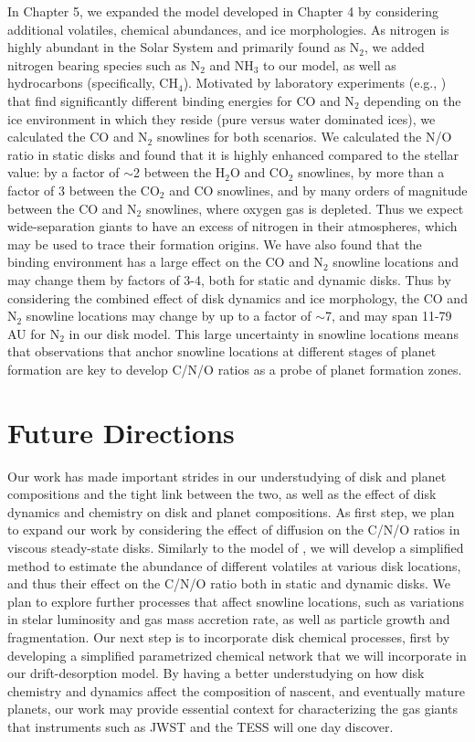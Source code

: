 In Chapter 5, we expanded the model developed in Chapter 4 by considering additional volatiles, chemical abundances, and ice morphologies. As nitrogen is highly abundant in the Solar System and primarily found as N$_2$, we added nitrogen bearing species such as N$_2$ and NH$_3$ to our model, as well as hydrocarbons (specifically, CH$_4$). Motivated by laboratory experiments (e.g., \citealt{fayolle16}) that find significantly different binding energies for CO and N$_2$ depending on the ice environment in which they reside (pure versus water dominated ices), we calculated the CO and N$_2$ snowlines for both scenarios. We calculated the N/O ratio in static disks and found that it is highly enhanced compared to the stellar value: by a factor of $\sim$2 between the H$_2$O and CO$_2$ snowlines, by more than a factor of 3 between the CO$_2$ and CO snowlines, and by many orders of magnitude between the CO and N$_2$ snowlines, where oxygen gas is depleted. Thus we expect wide-separation giants to have an excess of nitrogen in their atmospheres, which may be used to trace their formation origins. We have also found that the binding environment has a large effect on the CO and N$_2$ snowline locations and may change them by factors of 3-4, both for static and dynamic disks. Thus by considering the combined effect of disk dynamics and ice morphology, the CO and N$_2$ snowline locations may change by up to a factor of $\sim$7, and may span 11-79 AU for N$_2$ in our disk model. This large uncertainty in snowline locations means that observations that anchor snowline locations at different stages of planet
formation are key to develop C/N/O ratios as a probe of planet formation zones. 

\section{Future Directions}
\label{sec:future}

Our work has made important strides in our understudying of disk and planet compositions and the tight link between the two, as well as the effect of disk dynamics and chemistry on disk and planet compositions. As first step, we plan to expand our work by considering the effect of diffusion on the C/N/O ratios in viscous steady-state disks. Similarly to the model of \citet{owen14}, we will develop a simplified method to estimate the abundance of different volatiles at various disk locations, and thus their effect on the C/N/O ratio both in static and dynamic disks. We plan to explore further processes that affect snowline locations, such as variations in stelar luminosity and gas mass accretion rate, as well as particle growth and fragmentation. Our next step is to incorporate disk chemical processes, first by developing a simplified parametrized chemical  network that we will incorporate in our  drift-desorption model. By having a better understudying on how disk chemistry and dynamics affect the composition of nascent, and eventually mature planets, our work may provide essential context for characterizing the gas giants
that instruments such as JWST and the TESS will one day discover.  
 
